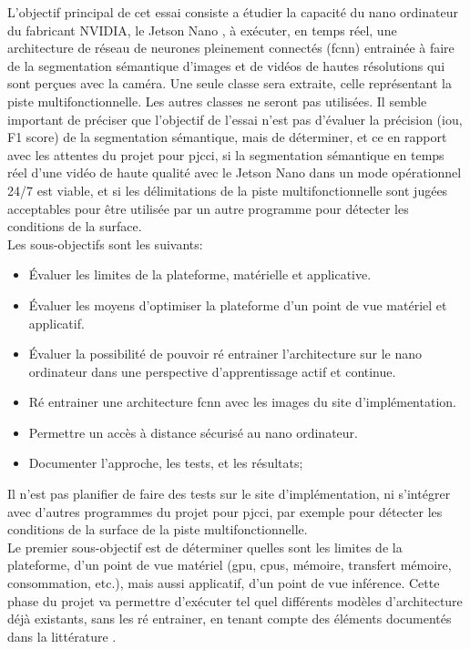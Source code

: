﻿\noindent L'objectif principal de cet essai consiste a étudier la capacité du nano ordinateur du fabricant NVIDIA, le Jetson Nano \parencite{nvidia_jetson_2019}, à exécuter, en temps réel, une architecture de réseau de neurones pleinement connectés (\acrshort{fcnn}) entrainée à faire de la segmentation sémantique d'images et de vidéos de hautes résolutions qui sont perçues avec la caméra. Une seule classe sera extraite, celle représentant la piste multifonctionnelle. Les autres classes ne seront pas utilisées. Il semble important de préciser que l'objectif de l'essai n'est pas d'évaluer la précision (\acrshort{iou},  F1 score) de la segmentation sémantique, mais de déterminer, et ce en rapport avec les attentes du projet pour \acrshort{pjcci}, si la segmentation sémantique en temps réel d'une vidéo de haute qualité avec le Jetson Nano dans un mode opérationnel 24/7 est viable, et si les délimitations de la piste multifonctionnelle sont jugées acceptables pour être utilisée par un autre programme pour détecter les conditions de la surface.
\vspace{\baselineskip}
\\
\noindent Les sous-objectifs sont les suivants: 
\begin{itemize}
   \item Évaluer les limites de la plateforme, matérielle et applicative.
   \item Évaluer les moyens d'optimiser la plateforme d'un point de vue matériel et applicatif. 
   \item Évaluer la possibilité de pouvoir ré entrainer l'architecture sur le nano ordinateur dans une perspective d'apprentissage actif et continue.
   \item Ré entrainer une architecture \acrshort{fcnn} avec les images du site d'implémentation.
   \item Permettre un accès à distance sécurisé au nano ordinateur.
   \item Documenter l'approche, les tests, et les résultats;
\end{itemize}
\vspace{\baselineskip}
\noindent Il n'est pas planifier de faire des tests sur le site d'implémentation, ni s'intégrer avec d'autres programmes du projet pour \acrshort{pjcci}, par exemple pour détecter les conditions de la surface de la piste multifonctionnelle. 
\vspace{\baselineskip}
\\
\noindent Le premier sous-objectif est de déterminer quelles sont les limites de la plateforme, d'un point de vue matériel (\acrshort{gpu}, \acrshort{cpu}s, mémoire, transfert mémoire, consommation, etc.), mais aussi applicatif, d'un point de vue inférence. Cette phase du projet va permettre d'exécuter tel quel différents modèles d'architecture déjà existants, sans les ré entrainer, en tenant compte des éléments documentés dans la littérature \parencite{nguyen_mavnet_2019, zheng_real-time_2020, nvidia_jetson_2019-1}.
